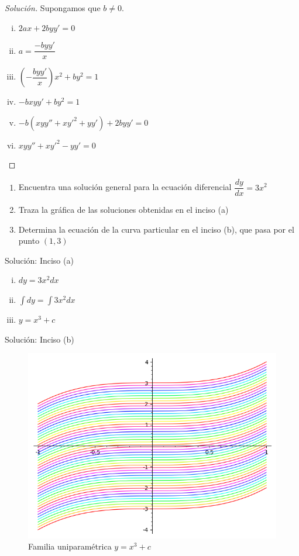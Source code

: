 
\begin{proof}[Solución]

	Supongamos que $b\neq 0$.
	\begin{enumerate}[(i)]
		\item $2ax+2byy'=0$
		\item $a = \dfrac{-byy'}{x}$
		\item $\left( -\dfrac{byy'}{x} \right)x^{2}+by^{2}=1$
		\item $-bxyy'+by^{2}=1$
		\item $-b\left( xyy''+xy'^{2}+yy' \right)
		+2byy'=0$
		\item $xyy''+xy'^{2}-yy'=0$
	\end{enumerate}
\end{proof}


\begin{enumerate}
	\item  Encuentra una solución general para la ecuación diferencial $\dfrac{dy}{dx}=3x^{2}$
	\item Traza la gráfica de las soluciones obtenidas en el inciso (a)
	\item Determina la ecuación de la curva particular en el inciso (b), que pasa por el punto $\left( 1,3 \right)$
\end{enumerate}

{Solución: Inciso (a)}
\begin{enumerate}[(i)]
	\item $dy=3x^{2}dx$
	\item $\displaystyle
	\int dy = \int 3x^{2}dx$

	\item $y=x^{3}+c$
\end{enumerate}

{Solución: Inciso (b)}
\begin{figure}
	\centering
	\includegraphics[height=.6\textheight,keepaspectratio=true]{./edo/solved_problem_02-08.png}
	\caption{Familia uniparamétrica $y=x^3+c$}
	\label{fig:solved_problem_02-08}
\end{figure}


